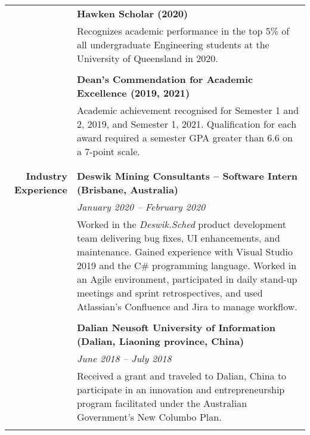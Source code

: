 \documentclass{article}
\begin{document}
\begin{longtable}{r | p{13cm}}
											& \large\textbf{Hawken Scholar (2020)} \\
											& Recognizes academic performance in the top 5\% of all undergraduate Engineering students at the University of Queensland in 2020. \\
											& \\
											
											& \large\textbf{Dean's Commendation for Academic Excellence (2019, 2021)} \\
											& Academic achievement recognised for Semester 1 and 2, 2019, and Semester 1, 2021. Qualification for each award required a semester GPA greater than 6.6 on a 7-point scale. \\
											& \\
											\hline \\

		\large\textbf{Industry Experience} 	& \large\textbf{Deswik Mining Consultants – Software Intern (Brisbane, Australia)} \\
											& \textit{January 2020 – February 2020} \\
											& Worked in the \textit{Deswik.Sched} product development team delivering bug fixes, UI enhancements, and maintenance. Gained experience with Visual Studio 2019 and the C\# programming language. Worked in an Agile environment, participated in daily stand-up meetings and sprint retrospectives, and used Atlassian’s Confluence and Jira to manage workflow. \\ 
											& \\

											& \large\textbf{Dalian Neusoft University of Information (Dalian, Liaoning province, China)} \\
											& \textit{June 2018 – July 2018} \\
											& Received a grant and traveled to Dalian, China to participate in an innovation and entrepreneurship program facilitated under the Australian Government’s New Columbo Plan. \\
											& \\
											\hline

%
											

\end{longtable}
\end{document}
